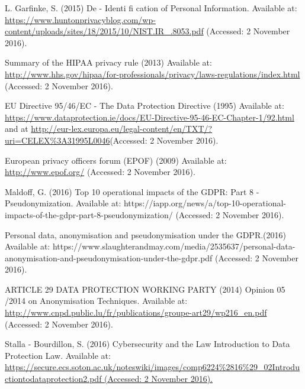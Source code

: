 \documentclass[9pt]{article}
\begin{document}
\newpage
\begin{thebibliography}{99}
L. Garfinke, S. (2015) De - Identi fi cation of Personal Information. Available at: \url{https://www.huntonprivacyblog.com/wp-content/uploads/sites/18/2015/10/NIST.IR_.8053.pdf} (Accessed: 2 November 2016).

Summary of the HIPAA privacy rule (2013) Available at: \url{http://www.hhs.gov/hipaa/for-professionals/privacy/laws-regulations/index.html} (Accessed: 2 November 2016).

EU Directive 95/46/EC - The Data Protection Directive (1995) Available at: \url{https://www.dataprotection.ie/docs/EU-Directive-95-46-EC-Chapter-1/92.html} and at \url{http://eur-lex.europa.eu/legal-content/en/TXT/?uri=CELEX%3A31995L0046}(Accessed: 2 November 2016).

 European privacy officers forum (EPOF) (2009) Available at: \url{http://www.epof.org/} (Accessed: 2 November 2016).

Maldoff, G. (2016) Top 10 operational impacts of the GDPR: Part 8 - Pseudonymization. Available at: https://iapp.org/news/a/top-10-operational-impacts-of-the-gdpr-part-8-pseudonymization/ (Accessed: 2 November 2016).

Personal data, anonymisation and pseudonymisation under the GDPR.(2016)  Available at: https://www.slaughterandmay.com/media/2535637/personal-data-anonymisation-and-pseudonymisation-under-the-gdpr.pdf (Accessed: 2 November 2016).

 ARTICLE 29 DATA PROTECTION WORKING PARTY (2014) Opinion 05 /2014 on Anonymisation Techniques. Available at: \url{http://www.cnpd.public.lu/fr/publications/groupe-art29/wp216_en.pdf} (Accessed: 2 November 2016).

Stalla - Bourdillon, S. (2016) Cybersecurity and the Law Introduction to Data Protection Law. Available at: \url{https://secure.ecs.soton.ac.uk/noteswiki/images/comp6224%2816%29_02Introductiontodataprotection2.pdf (Accessed: 2 November 2016).}


\end{thebibliography}
\end{document}

